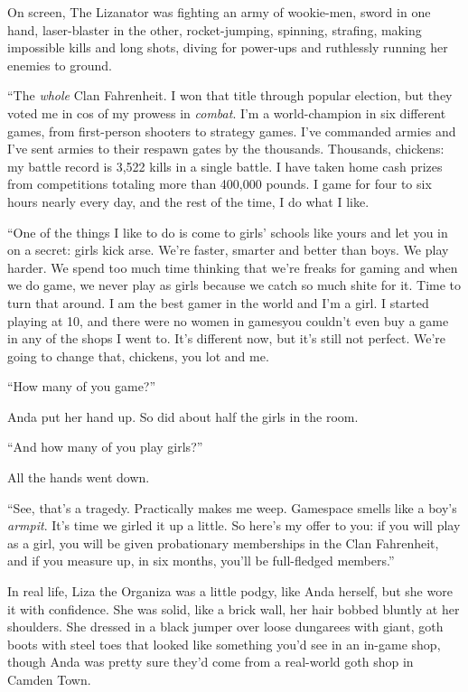On screen, The Lizanator was fighting an army of wookie-men, sword
in one hand, laser-blaster in the other, rocket-jumping, spinning,
strafing, making impossible kills and long shots, diving for
power-ups and ruthlessly running her enemies to ground.

“The \emph{whole} Clan Fahrenheit. I won that title through popular
election, but they voted me in cos of my prowess in \emph{combat}.
I’m a world-champion in six different games, from first-person
shooters to strategy games. I’ve commanded armies and I’ve sent
armies to their respawn gates by the thousands. Thousands,
chickens: my battle record is 3,522 kills in a single battle. I
have taken home cash prizes from competitions totaling more than
400,000 pounds. I game for four to six hours nearly every day, and
the rest of the time, I do what I like.

“One of the things I like to do is come to girls’ schools like
yours and let you in on a secret: girls kick arse. We’re faster,
smarter and better than boys. We play harder. We spend too much
time thinking that we’re freaks for gaming and when we do game, we
never play as girls because we catch so much shite for it. Time to
turn that around. I am the best gamer in the world and I’m a girl.
I started playing at 10, and there were no women in games\dash{}you
couldn’t even buy a game in any of the shops I went to. It’s
different now, but it’s still not perfect. We’re going to change
that, chickens, you lot and me.

“How many of you game?”

Anda put her hand up. So did about half the girls in the room.

“And how many of you play girls?”

All the hands went down.

“See, that’s a tragedy. Practically makes me weep. Gamespace smells
like a boy’s \emph{armpit}. It’s time we girled it up a little. So
here’s my offer to you: if you will play as a girl, you will be
given probationary memberships in the Clan Fahrenheit, and if you
measure up, in six months, you’ll be full-fledged members.”

In real life, Liza the Organiza was a little podgy, like Anda
herself, but she wore it with confidence. She was solid, like a
brick wall, her hair bobbed bluntly at her shoulders. She dressed
in a black jumper over loose dungarees with giant, goth boots with
steel toes that looked like something you’d see in an in-game shop,
though Anda was pretty sure they’d come from a real-world goth shop
in Camden Town.

